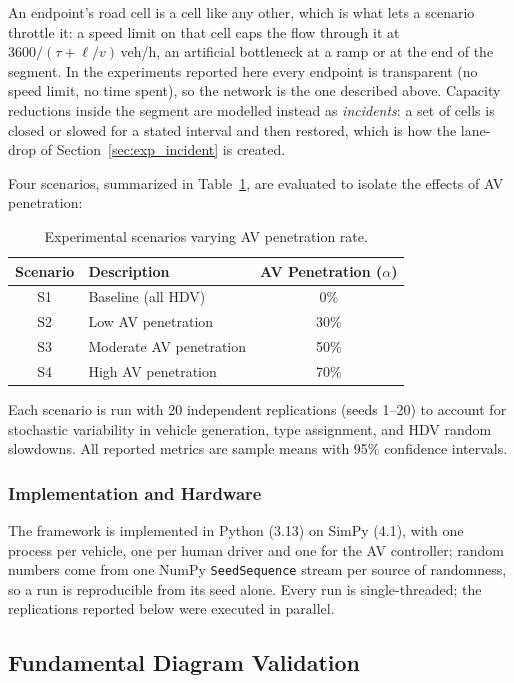 \documentclass[review,number]{elsarticle}
\begin{document}
An endpoint's road cell is a cell like any other, which is what lets a scenario throttle it: a speed limit on that cell caps the flow through it at $3600 / (\tau + \ell/v)$\,veh/h, an artificial bottleneck at a ramp or at the end of the segment. In the experiments reported here every endpoint is transparent (no speed limit, no time spent), so the network is the one described above. Capacity reductions inside the segment are modelled instead as \emph{incidents}: a set of cells is closed or slowed for a stated interval and then restored, which is how the lane-drop of Section~\ref{sec:exp_incident} is created.

Four scenarios, summarized in Table~\ref{tab:scenarios}, are evaluated to isolate the effects of AV penetration:

\begin{table}[ht]
\centering
\caption{Experimental scenarios varying AV penetration rate.}
\label{tab:scenarios}
\begin{tabular}{@{}clc@{}}
\toprule
Scenario & Description & AV Penetration ($\alpha$) \\
\midrule
S1 & Baseline (all HDV) & 0\% \\
S2 & Low AV penetration & 30\% \\
S3 & Moderate AV penetration & 50\% \\
S4 & High AV penetration & 70\% \\
\bottomrule
\end{tabular}
\end{table}

Each scenario is run with 20 independent replications (seeds 1--20) to account for stochastic variability in vehicle generation, type assignment, and HDV random slowdowns. All reported metrics are sample means with 95\% confidence intervals.

\subsubsection{Implementation and Hardware}

The framework is implemented in Python (3.13) on SimPy (4.1), with one process per vehicle, one per human driver and one for the AV controller; random numbers come from one NumPy \texttt{SeedSequence} stream per source of randomness, so a run is reproducible from its seed alone. Every run is single-threaded; the replications reported below were executed in parallel.


\subsection{Fundamental Diagram Validation}
\label{sec:exp_fd}
\end{document}
